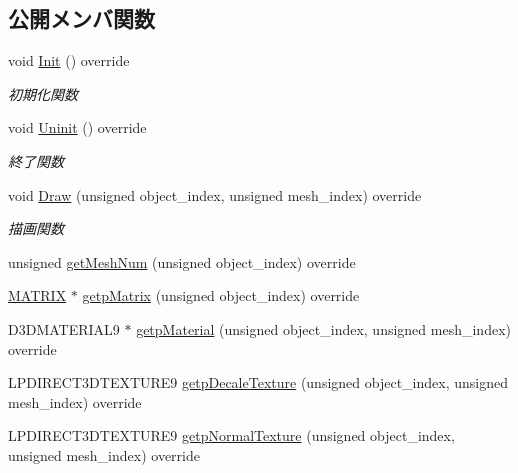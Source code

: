 \subsection*{公開メンバ関数}
\begin{DoxyCompactItemize}
\item 
void \mbox{\hyperlink{class_player_draw_ad79a0fbeb618e0913822b573e5d0be68}{Init}} () override
\begin{DoxyCompactList}\small\item\em 初期化関数 \end{DoxyCompactList}\item 
void \mbox{\hyperlink{class_player_draw_a917b2947914287f23d87ca75cd68f553}{Uninit}} () override
\begin{DoxyCompactList}\small\item\em 終了関数 \end{DoxyCompactList}\item 
void \mbox{\hyperlink{class_player_draw_a8b9e8caa6bea7295f58a0aaddeb9458b}{Draw}} (unsigned object\+\_\+index, unsigned mesh\+\_\+index) override
\begin{DoxyCompactList}\small\item\em 描画関数 \end{DoxyCompactList}\item 
unsigned \mbox{\hyperlink{class_player_draw_ac618153d70492f73299c58a50d565431}{get\+Mesh\+Num}} (unsigned object\+\_\+index) override
\item 
\mbox{\hyperlink{_vector3_d_8h_a032295cd9fb1b711757c90667278e744}{M\+A\+T\+R\+IX}} $\ast$ \mbox{\hyperlink{class_player_draw_a334e94f368f6bd571da866d69333f313}{getp\+Matrix}} (unsigned object\+\_\+index) override
\item 
D3\+D\+M\+A\+T\+E\+R\+I\+A\+L9 $\ast$ \mbox{\hyperlink{class_player_draw_acb94ea7611a99698507321e44b7e9acb}{getp\+Material}} (unsigned object\+\_\+index, unsigned mesh\+\_\+index) override
\item 
L\+P\+D\+I\+R\+E\+C\+T3\+D\+T\+E\+X\+T\+U\+R\+E9 \mbox{\hyperlink{class_player_draw_ae69b46285241f390fbf62f6af2b5340d}{getp\+Decale\+Texture}} (unsigned object\+\_\+index, unsigned mesh\+\_\+index) override
\item 
L\+P\+D\+I\+R\+E\+C\+T3\+D\+T\+E\+X\+T\+U\+R\+E9 \mbox{\hyperlink{class_player_draw_a231aa618a0bf71311b61897ccf7191b8}{getp\+Normal\+Texture}} (unsigned object\+\_\+index, unsigned mesh\+\_\+index) override
\end{DoxyCompactItemize}
